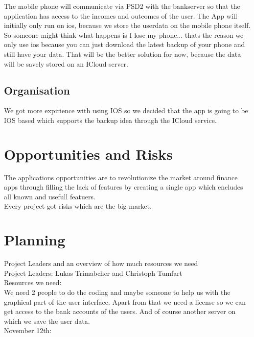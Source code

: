 \documentclass[12pt]{article}
\theoremstyle{definition}
\begin{document}
The mobile phone will communicate via PSD2 with the bankserver so that the application has access to the incomes and outcomes of the user.
The App will initially only run on ios, because we store the userdata on the mobile phone itself. So someone might think what happens is I lose my phone...
thats the reason we only use ios because you can just download the latest backup of your phone and still have your data.
That will be the better solution for now, because the data will be savely stored on an ICloud server.

\subsection{Organisation}

We got more expirience with using IOS so we decided that the app is going to be IOS based which supports the backup idea through the ICloud service.



\pagebreak
\section{Opportunities and Risks}

The applications opportunities are to revolutionize the market around finance apps
through filling the lack of features by creating a single app which encludes all known and usefull featuers. 
\\

Every project got risks which are the big market.


\pagebreak
\section{Planning}

Project Leaders and an overview of how much resources we need
\\

Project Leaders: Lukas Trimabcher and Christoph Tumfart
\\

Resources we need:
\\

We need 2 people to do the coding and maybe someone to help us with the graphical part of the user interface. Apart from that we need a license so we can get access to the bank accounts of the users.
And of course another server on which we save the user data.
\\

November 12th:
\\
\end{document}
